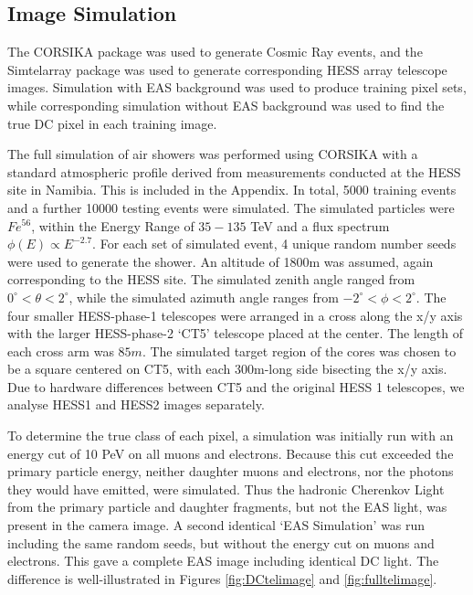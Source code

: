 \documentclass[11pt]{article}
\begin{document}
\subsection{Image Simulation}
The CORSIKA package \cite{Heck98} was used to generate Cosmic Ray events, and the Sim\textunderscore telarray package  \cite{Bernlohr08} was used to generate corresponding HESS array telescope images.  Simulation with EAS background was used to produce training pixel sets, while corresponding simulation without EAS background was used to find the true DC pixel in each training image.

The full simulation of air showers was performed using CORSIKA with a standard atmospheric profile derived from measurements conducted at the HESS site in Namibia. This is included in the Appendix. In total, 5000 training events and a further 10000 testing events were simulated. The simulated particles were $Fe^{56}$, within the Energy Range of $35-135$ TeV and a flux spectrum $\phi(E) \propto E^{-2.7}$. For each set of simulated event, 4 unique random number seeds were used to generate the shower. An altitude of 1800m was assumed, again corresponding to the HESS site. The simulated zenith angle ranged from $0^{\circ} < \theta < 2 ^{\circ}$, while the simulated azimuth angle ranges from $-2^{\circ} < \phi < 2 ^{\circ}$. The four smaller HESS-phase-1 telescopes were arranged in a cross along the x/y axis with the larger HESS-phase-2 \textquoteleft CT5' telescope placed at the center. The length of each cross arm was $85m$. The simulated target region of the cores was chosen to be a square centered on CT5, with each 300m-long side bisecting the x/y axis. Due to hardware differences between CT5 and the original HESS 1 telescopes, we analyse HESS1 and HESS2 images separately. 

To determine the true class of each pixel, a simulation was initially run with an energy cut of 10 PeV on all muons and electrons. Because this cut exceeded the primary particle energy, neither daughter muons and electrons, nor the photons they would have emitted, were simulated. Thus the hadronic Cherenkov Light from the primary particle and daughter fragments, but not the EAS light, was present in the camera image. A second identical \textquoteleft EAS Simulation' was run including the same random seeds, but without the energy cut on muons and electrons. This gave a complete EAS image including identical DC light. The difference is well-illustrated in Figures \ref{fig:DCtelimage} and \ref{fig:fulltelimage}.
\end{document}
